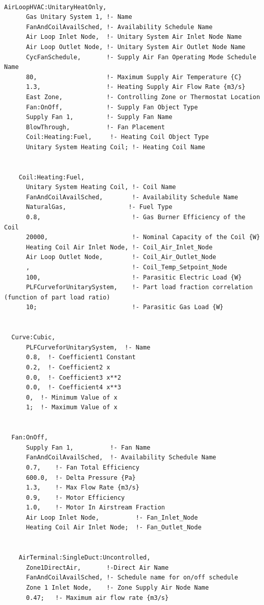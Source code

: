 \begin{lstlisting}

AirLoopHVAC:UnitaryHeatOnly,
      Gas Unitary System 1, !- Name
      FanAndCoilAvailSched, !- Availability Schedule Name
      Air Loop Inlet Node,  !- Unitary System Air Inlet Node Name
      Air Loop Outlet Node, !- Unitary System Air Outlet Node Name
      CycFanSchedule,       !- Supply Air Fan Operating Mode Schedule Name
      80,                   !- Maximum Supply Air Temperature {C}
      1.3,                  !- Heating Supply Air Flow Rate {m3/s}
      East Zone,            !- Controlling Zone or Thermostat Location
      Fan:OnOff,            !- Supply Fan Object Type
      Supply Fan 1,         !- Supply Fan Name
      BlowThrough,          !- Fan Placement
      Coil:Heating:Fuel,     !- Heating Coil Object Type
      Unitary System Heating Coil; !- Heating Coil Name


    Coil:Heating:Fuel,
      Unitary System Heating Coil, !- Coil Name
      FanAndCoilAvailSched,        !- Availability Schedule Name
      NaturalGas,                 !- Fuel Type
      0.8,                         !- Gas Burner Efficiency of the Coil
      20000,                       !- Nominal Capacity of the Coil {W}
      Heating Coil Air Inlet Node, !- Coil_Air_Inlet_Node
      Air Loop Outlet Node,        !- Coil_Air_Outlet_Node
      ,                            !- Coil_Temp_Setpoint_Node
      100,                         !- Parasitic Electric Load {W}
      PLFCurveforUnitarySystem,    !- Part load fraction correlation (function of part load ratio)
      10;                          !- Parasitic Gas Load {W}


  Curve:Cubic,
      PLFCurveforUnitarySystem,  !- Name
      0.8,  !- Coefficient1 Constant
      0.2,  !- Coefficient2 x
      0.0,  !- Coefficient3 x**2
      0.0,  !- Coefficient4 x**3
      0,  !- Minimum Value of x
      1;  !- Maximum Value of x


  Fan:OnOff,
      Supply Fan 1,          !- Fan Name
      FanAndCoilAvailSched,  !- Availability Schedule Name
      0.7,    !- Fan Total Efficiency
      600.0,  !- Delta Pressure {Pa}
      1.3,    !- Max Flow Rate {m3/s}
      0.9,    !- Motor Efficiency
      1.0,    !- Motor In Airstream Fraction
      Air Loop Inlet Node,          !- Fan_Inlet_Node
      Heating Coil Air Inlet Node;  !- Fan_Outlet_Node


    AirTerminal:SingleDuct:Uncontrolled,
      Zone1DirectAir,       !-Direct Air Name
      FanAndCoilAvailSched, !- Schedule name for on/off schedule
      Zone 1 Inlet Node,    !- Zone Supply Air Node Name
      0.47;   !- Maximum air flow rate {m3/s}



\end{lstlisting}
